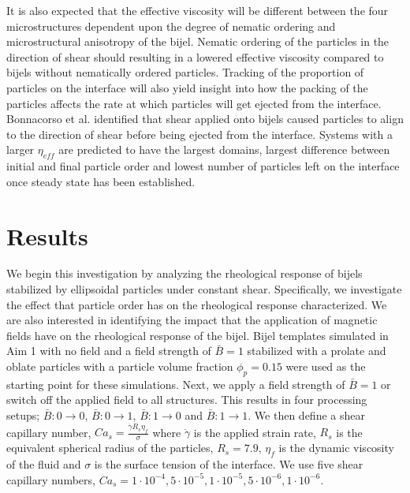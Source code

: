 It is also expected that the effective viscosity will be different between the four microstructures dependent upon the 
degree of nematic ordering and microstructural anisotropy of the bijel. Nematic ordering of the particles in the direction of shear
should resulting in a lowered effective viscosity compared to bijels without nematically 
ordered particles. \cite{xu_relation_2013, vermant_flow-induced_2005} Tracking of the proportion of particles on the 
interface will also yield insight into how the packing of the particles affects the rate at which particles will get 
ejected from the interface. Bonnacorso et al. identified that shear applied onto bijels caused particles to align to the direction of
shear before being ejected from the interface. Systems with a larger $\eta_{eff}$ are predicted to have the largest domains, largest 
difference between initial and final particle order and lowest number of particles left on the interface once steady 
state has been established. 

\section{Results}\label{sec:results_p3}

We begin this investigation by analyzing the rheological response of bijels stabilized by ellipsoidal particles under constant shear.
Specifically, we investigate the effect that particle order has on the rheological response characterized. We are also interested in
identifying the impact that the application of magnetic fields have on the rheological response of the bijel. 
Bijel templates simulated in Aim 1 with no field and a field strength of $\bar{B} = 1$ stabilized with a prolate and oblate particles with a 
particle volume fraction $\phi_p = 0.15$ were used as the starting point for these simulations. Next, we apply a field strength of
$\bar{B} = 1$ or switch off the applied field to all structures. This results in four processing setups; $\bar{B}:0\rightarrow 0$, $\bar{B}:0\rightarrow 1$,
$\bar{B}:1\rightarrow 0$ and $\bar{B}:1\rightarrow 1$. We then define a shear capillary number,  $Ca_s = \frac{\dot{\gamma} R_{s} \eta_{f}}{\sigma}$ where 
$\dot{\gamma}$ is the applied strain rate, $R_s$ is the equivalent spherical radius of the particles, $R_s = 7.9$, $\eta_f$ is the dynamic viscosity of the 
fluid and $\sigma$ is the surface tension of the interface. We use five shear capillary numbers, 
$Ca_s = 1\cdot10^{-4}, 5\cdot10^{-5}, 1\cdot10^{-5}, 5\cdot10^{-6}, 1\cdot10^{-6}$.

